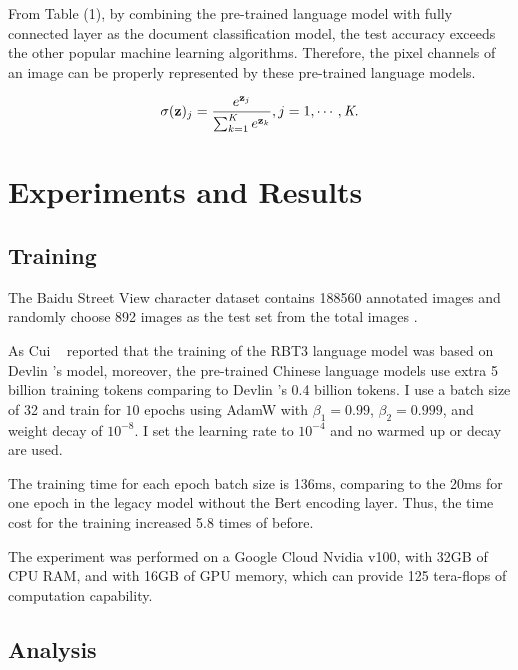 \documentclass[10pt,twocolumn,letterpaper]{article}
\begin{document}
\par From Table (1), by combining the pre-trained language model with fully connected layer as the document classification model,
the test accuracy exceeds the other popular machine learning algorithms.
Therefore, the pixel channels of an image can be properly represented by these pre-trained language models.


\begin{equation}
  \sigma(\textbf{z})_j = {e^{\textbf{z}_j} \over {\sum_{k=1}^{\textit{K}} e^{\textbf{z}_k}}}, j=1,\cdots,\textit{K}.
\end{equation}



\section{Experiments and Results}


\subsection{Training}

The Baidu Street View character dataset contains 188560 annotated images and randomly choose 892 images as the test set from the total images .

As Cui \etal~\cite{cui2020revisiting} reported that the training of the RBT3 language model was based on Devlin \etal's model,
moreover, the pre-trained Chinese language models use extra 5 billion training tokens comparing to Devlin \etal's 0.4 billion tokens.
I use a batch size of 32 and train for $10$ epochs using AdamW with $\beta_1=0.99$, $\beta_2=0.999$, and weight decay of $10^{-8}$.
I set the learning rate to $10^{-4}$ and no warmed up or decay are used.

\par The training time for each epoch batch size is 136ms, comparing to the 20ms for one epoch in the legacy model without the Bert encoding layer.
Thus, the time cost for the training increased 5.8 times of before.

\par The experiment was performed on a Google Cloud Nvidia v100, with 32GB of CPU RAM, and with 16GB of GPU memory,
which can provide 125 tera-flops of computation capability.

\subsection{Analysis}
\end{document}
